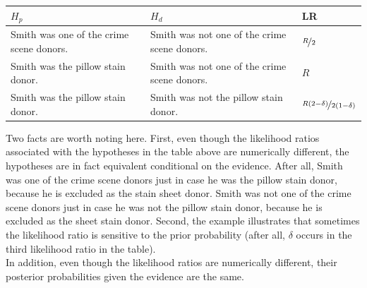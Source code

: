 \documentclass[10pt,dvipsnames,enabledeprecatedfontcommands]{scrartcl}
\begin{document}
\begin{center}
    \footnotesize
    \begin{tabular}{@{}p{5cm}p{5cm}l@{}}
        \toprule
        $H_p$ & $H_d$  & LR \\ \midrule
        Smith was one of the crime scene donors.   &  Smith was not one of the crime scene donors. & $\nicefrac{R}{2}$   \\
        Smith was the pillow stain donor.     & Smith was not one of the crime scene donors.& $R$\\
        Smith was the pillow stain donor. & Smith was not the pillow stain donor. &  $\nicefrac{R(2-\delta)}{2(1-\delta)}$
        \\ \bottomrule
    \end{tabular}
\end{center}

\normalsize
\vspace{2mm} \noindent
Two facts are worth noting here. First, even though the likelihood
ratios associated with the hypotheses in the table above are numerically
different, the hypotheses are in fact equivalent conditional on the
evidence. After all, Smith was one of the crime scene donors just in
case he was the pillow stain donor, because he is excluded as the stain
sheet donor. Smith was not one of the crime scene donors just in case he
was not the pillow stain donor, because he is excluded as the sheet
stain donor. Second, the example illustrates that sometimes the
likelihood ratio is sensitive to the prior probability (after all,
\(\delta\) occurs in the third likelihood ratio in the table).\\
In addition, even though the likelihood ratios are numerically
different, their posterior probabilities given the evidence are the
same.
\end{document}
